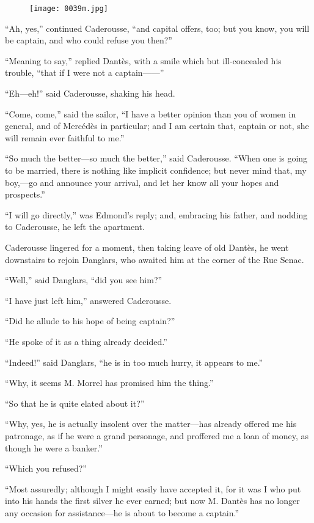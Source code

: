 \begin{figure}[h]
\texttt{[image: 0039m.jpg]}
\end{figure}

“Ah, yes,” continued Caderousse, “and capital offers, too; but you
know, you will be captain, and who could refuse you then?”

“Meaning to say,” replied Dantès, with a smile which but ill-concealed
his trouble, “that if I were not a captain——”

“Eh—eh!” said Caderousse, shaking his head.

“Come, come,” said the sailor, “I have a better opinion than you of
women in general, and of Mercédès in particular; and I am certain that,
captain or not, she will remain ever faithful to me.”

“So much the better—so much the better,” said Caderousse. “When one is
going to be married, there is nothing like implicit confidence; but
never mind that, my boy,—go and announce your arrival, and let her know
all your hopes and prospects.”

“I will go directly,” was Edmond’s reply; and, embracing his father,
and nodding to Caderousse, he left the apartment.

Caderousse lingered for a moment, then taking leave of old Dantès, he
went downstairs to rejoin Danglars, who awaited him at the corner of
the Rue Senac.

“Well,” said Danglars, “did you see him?”

“I have just left him,” answered Caderousse.

“Did he allude to his hope of being captain?”

“He spoke of it as a thing already decided.”

“Indeed!” said Danglars, “he is in too much hurry, it appears to me.”

“Why, it seems M. Morrel has promised him the thing.”

“So that he is quite elated about it?”

“Why, yes, he is actually insolent over the matter—has already offered
me his patronage, as if he were a grand personage, and proffered me a
loan of money, as though he were a banker.”

“Which you refused?”

“Most assuredly; although I might easily have accepted it, for it was I
who put into his hands the first silver he ever earned; but now M.
Dantès has no longer any occasion for assistance—he is about to become
a captain.”

